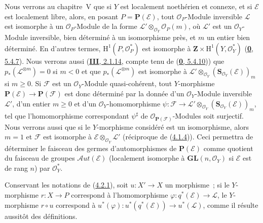\begin{remark}[4.2.7]
\label{II.4.2.7-fr}
Nous verrons au chapitre~V que si $Y$ est localement noethérien et connexe,
et si $\mathcal{E}$ est localement libre, alors, en posant
$P=\mathbf{P}(\mathcal{E})$, tout $\mathcal{O}_P$-Module inversible
$\mathcal{L}$ est isomorphe à un $\mathcal{O}_P$-Module de la forme
$\mathcal{L}'\otimes_{\mathcal{O}_Y}\mathcal{O}_P(m)$, où $\mathcal{L}'$ est
un $\mathcal{O}_Y$-Module inversible, bien déterminé à un isomorphisme près,
et $m$ un entier bien déterminé. En d'autres termes,
$\mathrm{H}^1(P,\mathcal{O}_P^*)$ est isomorphe à
$\mathbf{Z}\times\mathrm{H}^1(Y,\mathcal{O}_Y^*)$
(\hyperref[0.5.4.7-fr]{\textbf{0}, 5.4.7}). Nous verrons aussi
(\hyperref[III.2.1.14-fr]{\textbf{III}, 2.1.14}, compte tenu de
(\hyperref[0.5.4.10-fr]{\textbf{0}, 5.4.10})) que
$p_*(\mathcal{L}^{\otimes m})=0$ si $m<0$ et que
$p_*(\mathcal{L}^{\otimes m})$ est isomorphe à
$\mathcal{L}'\otimes_{\mathcal{O}_Y}
(\mathbf{S}_{\mathcal{O}_Y}(\mathcal{E}))_m$ si $m\geq0$. Si $\mathcal{F}$
est un $\mathcal{O}_Y$-Module quasi-cohérent, tout $Y$-morphisme
$\mathbf{P}(\mathcal{E})\to\mathbf{P}(\mathcal{F})$ est donc déterminé par
la donnée d'un $\mathcal{O}_Y$-Module inversible $\mathcal{L}'$, d'un entier
$m\geq0$ et d'un $\mathcal{O}_Y$-homomorphisme
$\psi:\mathcal{F}\to\mathcal{L}'\otimes_{\mathcal{O}_Y}
(\mathbf{S}_{\mathcal{O}_Y}(\mathcal{E}))_m$, tel que l'homomorphisme
correspondant $\psi^\sharp$ de $\mathcal{O}_{\mathbf{P}(\mathcal{F})}$-Modules
soit surjectif. Nous verrons aussi que si le $Y$-morphisme considéré est un
isomorphisme, alors $m=1$ et $\mathcal{F}$ est isomorphe à
$\mathcal{E}\otimes_{\mathcal{O}_Y}\mathcal{L}'$ (réciproque de
(\hyperref[II.4.1.4-fr]{4.1.4})). Ceci permettra de déterminer le faisceau
des germes d'automorphismes de $\mathbf{P}(\mathcal{E})$ comme quotient du
faisceau de groupes $\mathcal{A}ut(\mathcal{E})$ (localement isomorphe à
$\mathbf{GL}(n,\mathcal{O}_Y)$ si $\mathcal{E}$ est de rang $n$) par
$\mathcal{O}_Y^*$.
\end{remark}

\begin{env}[4.2.8]
\label{II.4.2.8-fr}
Conservant les notations de (\hyperref[II.4.2.1-fr]{4.2.1}), soit
$u:X'\to X$ un morphisme~; si le $Y$-morphisme $r:X\to P$ correspond à
l'homomorphisme $\varphi:q^*(\mathcal{E})\to\mathcal{L}$, le $Y$-morphisme
$r\circ u$ correspond à
$u^*(\varphi):u^*(q^*(\mathcal{E}))\to u^*(\mathcal{L})$, comme il résulte
aussitôt des définitions.
\end{env}


